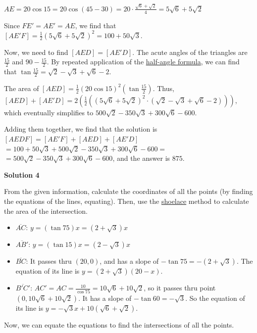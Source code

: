 \begin{enumerate}
 $AE = 20 \cos 15 = 20 \cos (45 - 30) = 20 \cdot \frac{\sqrt{6} + \sqrt{2}}{4} = 5\sqrt{6} + 5\sqrt{2}$

 Since $FE' = AE' = AE$, we find that $[AE'F] = \frac 12 (5\sqrt{6} + 5\sqrt{2})^2 = 100 + 50\sqrt{3}$.

 Now, we need to find $[AED] = [AE'D]$. The acute angles of the triangles are $\frac{15}{2}$ and $90 - \frac{15}{2}$. By repeated application of the \href{https://artofproblemsolving.com/wiki/index.php?title=Trigonometric\_identity}{half-angle formula}, we can find that $\tan \frac{15}{2} = \sqrt{2} - \sqrt{3} + \sqrt{6} - 2$.

 The area of $[AED] = \frac 12 \left(20 \cos 15\right)^2 \left(\tan \frac{15}{2}\right)$. Thus, $[AED] + [AE'D] = 2\left(\frac 12((5\sqrt{6} + 5\sqrt{2})^2 \cdot (\sqrt{2} - \sqrt{3} + \sqrt{6} - 2))\right)$, which eventually simplifies to $500\sqrt{2} - 350\sqrt{3} + 300\sqrt{6} - 600$. 

 Adding them together, we find that the solution is $[AEDF] = [AE'F] + [AED] + [AE'D]$ $= 100 + 50\sqrt{3} + 500\sqrt{2} - 350\sqrt{3} + 300\sqrt{6} - 600=$ $= 500\sqrt{2} - 350\sqrt{3} + 300\sqrt{6} - 600$, and the answer is $\boxed{875}$.

 



\textbf{Solution 4}

From the given information, calculate the coordinates of all the points (by finding the equations of the lines, equating). Then, use the \href{https://artofproblemsolving.com/wiki/index.php?title=Shoelace}{shoelace} method to calculate the area of the intersection.

 
            \begin{itemize}
        \item $\overline{AC}$: $y = (\tan 75) x = (2 + \sqrt{3})x$
        \item $\overline{AB'}$: $y = (\tan 15) x = (2 - \sqrt{3})x$
        \item $\overline{BC}$: It passes thru $(20,0)$, and has a slope of $-\tan75 = -(2 + \sqrt{3})$. The equation of its line is  $y = (2+\sqrt{3})(20 - x)$.
        \item $\overline{B'C'}$: $AC' = AC = \frac{10}{\cos 75} = 10\sqrt{6} + 10\sqrt{2}$, so it passes thru point $(0, 10\sqrt{6} + 10\sqrt{2})$. It has a slope of $-\tan 60 = -\sqrt{3}$. So the equation of its line is $y = -\sqrt{3}x + 10(\sqrt{6} + \sqrt{2})$.
            \end{itemize}
            Now, we can equate the equations to find the intersections of all the points.


\end{enumerate}
